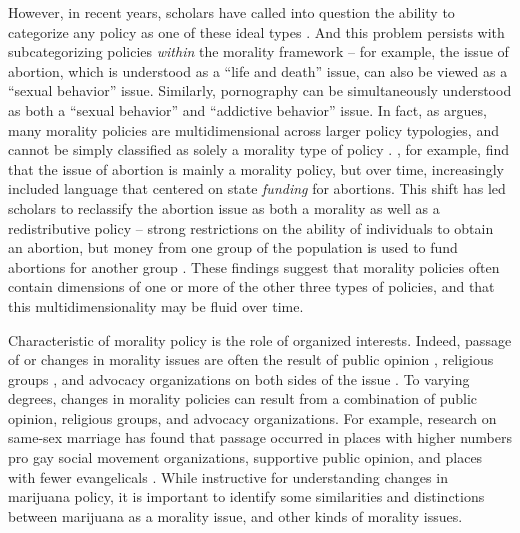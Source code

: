 However, in recent years, scholars have called into question the ability to categorize any policy as one of these ideal types \citep{greenberg_et_al_1977,roh_and_berry_2008,spitzer_1987,steinberger_1980}. And this problem persists with subcategorizing policies \textit{within} the morality framework -- for example, the issue of abortion, which is understood as a ``life and death'' issue, can also be viewed as a ``sexual behavior'' issue. Similarly, pornography can be simultaneously understood as both a ``sexual behavior'' and ``addictive behavior'' issue. In fact, as \citet{meier_2001} argues, many morality policies are multidimensional across larger policy typologies, and cannot be simply classified as solely a morality type of policy \citep{spitzer_1995}. \citet{roh_and_berry_2008}, for example, find that the issue of abortion is mainly a morality policy, but over time, increasingly included language that  centered on state \textit{funding} for abortions. This shift has led scholars to reclassify the abortion issue as both a morality as well as a redistributive policy -- strong restrictions on the ability of individuals to obtain an abortion, but money from one group of the population is used to fund abortions for another group \citep{roh_and_berry_2008,meier_and_mcfarlane_1993}. These findings suggest that morality policies often contain dimensions of one or more of the other three types of policies, and that this multidimensionality may be fluid over time.

Characteristic of morality policy is the role of organized interests. Indeed, passage of or changes in morality issues are often the result of public opinion \citep{geer_1996}, religious groups \citep{morgan_and_meier_1980,fairbanks_1977}, and advocacy organizations on both sides of the issue \citep{haider_markel_and_meier_1996,mooney_1999,roh_and_berry_2008}. To varying degrees, changes in morality policies can result from a combination of public opinion, religious groups, and advocacy organizations. For example, research on same-sex marriage has found that passage occurred in places with higher numbers pro gay social movement organizations, supportive public opinion, and places with fewer evangelicals \citep{baunach_2012,soule_2004}. While instructive for understanding changes in marijuana policy, it is important to identify some similarities and distinctions between marijuana as a morality issue, and other kinds of morality issues. 



